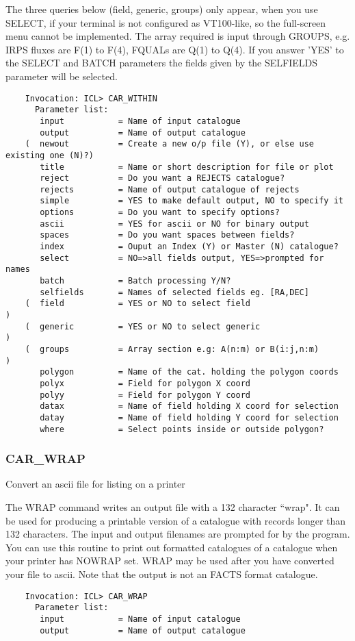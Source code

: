 The three queries below (field, generic, groups) only appear, when you use
SELECT, if your terminal is not configured as VT100-like, so the full-screen
menu cannot be implemented.
The array required is input through GROUPS, e.g. IRPS fluxes are F(1) to
F(4), FQUALs are Q(1) to Q(4).
If you answer 'YES' to the SELECT and BATCH parameters the fields given by the
SELFIELDS parameter will be selected.

\begin{verbatim}
    Invocation: ICL> CAR_WITHIN
      Parameter list:
       input           = Name of input catalogue
       output          = Name of output catalogue
    (  newout          = Create a new o/p file (Y), or else use existing one (N)?)
       title           = Name or short description for file or plot
       reject          = Do you want a REJECTS catalogue?
       rejects         = Name of output catalogue of rejects
       simple          = YES to make default output, NO to specify it
       options         = Do you want to specify options?
       ascii           = YES for ascii or NO for binary output
       spaces          = Do you want spaces between fields?
       index           = Ouput an Index (Y) or Master (N) catalogue?
       select          = NO=>all fields output, YES=>prompted for names
       batch           = Batch processing Y/N?
       selfields       = Names of selected fields eg. [RA,DEC]
    (  field           = YES or NO to select field                               )
    (  generic         = YES or NO to select generic                             )
    (  groups          = Array section e.g: A(n:m) or B(i:j,n:m)                 )
       polygon         = Name of the cat. holding the polygon coords
       polyx           = Field for polygon X coord
       polyy           = Field for polygon Y coord
       datax           = Name of field holding X coord for selection
       datay           = Name of field holding Y coord for selection
       where           = Select points inside or outside polygon?
\end{verbatim}

\subsubsection{CAR\_WRAP}

Convert an ascii file for listing on a printer

The WRAP command writes an output file with a 132 character ``wrap".
It can be used for producing a printable version of a catalogue with records
longer than 132 characters.
The input and output filenames are prompted for by the program.
You can use this routine to print out formatted catalogues of a catalogue
when your printer has NOWRAP set.
WRAP may be used after you have converted your file to ascii.
Note that the output is not an FACTS format catalogue.
\begin{verbatim}
    Invocation: ICL> CAR_WRAP
      Parameter list:
       input           = Name of input catalogue
       output          = Name of output catalogue
\end{verbatim}

